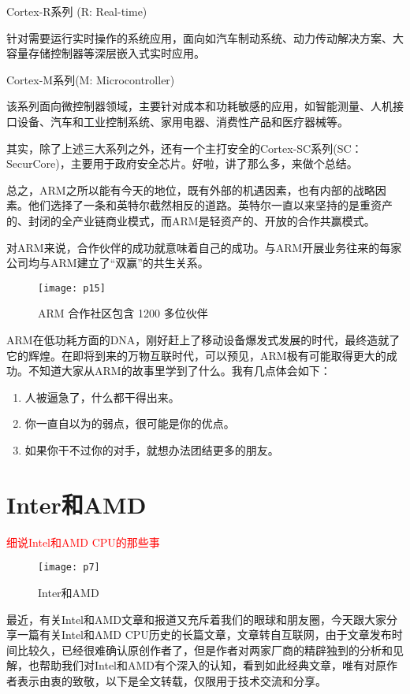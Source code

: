 \documentclass[utf8]{book}
\begin{document}
	Cortex-R系列 (R: Real-time)

	针对需要运行实时操作的系统应用，面向如汽车制动系统、动力传动解决方案、大容量存储控制器等深层嵌入式实时应用。


	Cortex-M系列(M: Microcontroller) 

	该系列面向微控制器领域，主要针对成本和功耗敏感的应用，如智能测量、人机接口设备、汽车和工业控制系统、家用电器、消费性产品和医疗器械等。


	其实，除了上述三大系列之外，还有一个主打安全的Cortex-SC系列(SC：SecurCore)，主要用于政府安全芯片。好啦，讲了那么多，来做个总结。

	总之，ARM之所以能有今天的地位，既有外部的机遇因素，也有内部的战略因素。他们选择了一条和英特尔截然相反的道路。英特尔一直以来坚持的是重资产的、封闭的全产业链商业模式，而ARM是轻资产的、开放的合作共赢模式。

	对ARM来说，合作伙伴的成功就意味着自己的成功。与ARM开展业务往来的每家公司均与ARM建立了“双赢”的共生关系。

	\begin{figure}[H]
	\centering
	\texttt{[image: p15]}
	\caption{ARM 合作社区包含 1200 多位伙伴}
	\end{figure}
	

	ARM在低功耗方面的DNA，刚好赶上了移动设备爆发式发展的时代，最终造就了它的辉煌。在即将到来的万物互联时代，可以预见，ARM极有可能取得更大的成功。不知道大家从ARM的故事里学到了什么。我有几点体会如下：
	\begin{enumerate}
		\item 人被逼急了，什么都干得出来。
		\item 你一直自以为的弱点，很可能是你的优点。
		\item  如果你干不过你的对手，就想办法团结更多的朋友。
	\end{enumerate}

\section{Inter和AMD}

	\begin{center}
		{\LARGE \textcolor{red}{细说Intel和AMD CPU的那些事}}
	\end{center}

	\begin{figure}[H]
	\centering
	\texttt{[image: p7]}
	\caption{Inter和AMD}
	\end{figure}
	最近，有关Intel和AMD文章和报道又充斥着我们的眼球和朋友圈，今天跟大家分享一篇有关Intel和AMD CPU历史的长篇文章，文章转自互联网，由于文章发布时间比较久，已经很难确认原创作者了，但是作者对两家厂商的精辟独到的分析和见解，也帮助我们对Intel和AMD有个深入的认知，看到如此经典文章，唯有对原作者表示由衷的致敬，以下是全文转载，仅限用于技术交流和分享。
\end{document}
